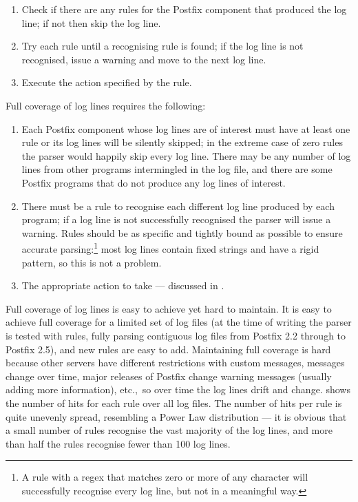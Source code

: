 \begin{enumerate}

    \item Check if there are any rules for the Postfix component that
        produced the log line; if not then skip the log line.

    \item Try each rule until a recognising rule is found; if the log line
        is not recognised, issue a warning and move to the next log line.

    \item Execute the action specified by the rule.

\end{enumerate}

Full coverage of log lines requires the following:

\begin{enumerate}

    \item Each Postfix component whose log lines are of interest must have
        at least one rule or its log lines will be silently skipped; in the
        extreme case of zero rules the parser would happily skip every log
        line.  There may be any number of log lines from other programs
        intermingled in the log file, and there are some Postfix programs
        that do not produce any log lines of interest.

    \item There must be a rule to recognise each different log line
        produced by each program; if a log line is not successfully
        recognised the parser will issue a warning.  Rules should be as
        specific and tightly bound as possible to ensure accurate
        parsing:\footnote{A rule with a regex that matches zero or more of
        any character will successfully recognise every log line, but not
        in a meaningful way.} most log lines contain fixed strings and have
        a rigid pattern, so this is not a problem.

    \item The appropriate action to take --- discussed in
        .

\end{enumerate}

Full coverage of log lines is easy to achieve yet hard to maintain.  It is
easy to achieve full coverage for a limited set of log files (at the time
of writing the parser is tested with \numberOFrules{} rules, fully parsing
\numberOFlogFILESall{} contiguous log files from Postfix 2.2 through to
Postfix 2.5), and new rules are easy to add.  Maintaining full coverage is
hard because other servers have different restrictions with custom
messages,  messages change over time, major releases of
Postfix change warning messages (usually adding more information), etc.,\
so over time the log lines drift and change.  
shows the number of hits for each rule over all \numberOFlogFILES{} log
files.  The number of hits per rule is quite unevenly spread, resembling a
Power Law distribution --- it is obvious that a small number of rules
recognise the vast majority of the log lines, and more than half the rules
recognise fewer than 100 log lines.

